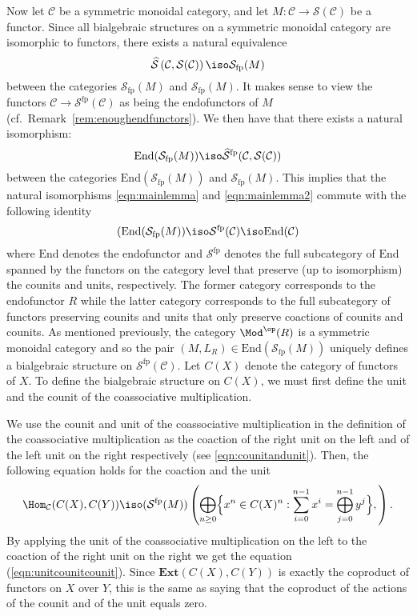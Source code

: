 \documentclass[a4paper,reqno,oneside]{article}
\begin{document}
Now let $\mathcal{C}$ be a symmetric monoidal category, and let $M \colon \mathcal{C} \to \mathcal{S}(\mathcal{C})$ be a functor. Since all bialgebraic structures on a symmetric monoidal category are isomorphic to functors, there exists a natural equivalence 
\[ \widehat{\mathcal{S}}\left(\mathcal{C},\mathcal{S}(\mathcal{C})\right) \iso \mathcal{S}_{\mathrm{fp}}(M)\]
between the categories $\mathcal{S}_{\mathrm{fp}}(M)$ and $\mathcal{S}_{\mathrm{fp}}(M)$. It makes sense to view the functors $\mathcal{C} \to \mathcal{S}^{\mathrm{fp}}(\mathcal{C})$ as being the endofunctors of $M$ (cf.~Remark~\ref{rem:enoughendfunctors}). We then have that there exists a natural isomorphism:
\[ \mathrm{End}(\mathcal{S}_{\mathrm{fp}}(M)) \iso \widehat{\mathcal{S}}^{\mathrm{fp}}(\mathcal{C},\mathcal{S}(\mathcal{C}))\] 
between the categories $\mathrm{End}(\mathcal{S}_{\mathrm{fp}}(M))$ and $\mathcal{S}_{\mathrm{fp}}(M)$. This implies that the natural isomorphisms \eqref{eqn:mainlemma} and \eqref{eqn:mainlemma2} commute with the following identity
\[
(\mathrm{End}(\mathcal{S}_{\mathrm{fp}}(M))\iso\mathcal{S}^{\mathrm{fp}}(\mathcal{C})\iso \mathrm{End}(\mathcal{C})
\]
where $\mathrm{End}$ denotes the endofunctor and $\mathcal{S}^{\mathrm{fp}}$ denotes the full subcategory of $\mathrm{End}$ spanned by the functors on the category level that preserve (up to isomorphism) the counits and units, respectively. The former category corresponds to the endofunctor $R$ while the latter category corresponds to the full subcategory of functors preserving counits and units that only preserve coactions of counits and counits. As mentioned previously, the category $\Mod^{\op}(R)$ is a symmetric monoidal category and so the pair $(M,L_R) \in \mathrm{End}(\mathcal{S}_{\mathrm{fp}}(M))$ uniquely defines a bialgebraic structure on $\mathcal{S}^{\mathrm{fp}}(\mathcal{C})$. Let $C(X)$ denote the category of functors of $X$. To define the bialgebraic structure on $C(X)$, we must first define the unit and the counit of the coassociative multiplication. 

We use the counit and unit of the coassociative multiplication in the definition of the coassociative multiplication as the coaction of the right unit on the left and of the left unit on the right respectively (see \eqref{eqn:counitandunit}). Then, the following equation holds for the coaction and the unit
\[
\Hom_\mathcal{C}(C(X), C(Y)) \iso (\mathcal{S}^{\mathrm{fp}}(M))\left(\bigoplus_{n \geq 0}\Bigl\{x^n \in C(X)^n : \sum_{i=0}^{n-1} x^i = \bigoplus_{j=0}^{n-1} y^j\Bigr\},\right).
\]
By applying the unit of the coassociative multiplication on the left to the coaction of the right unit on the right we get the equation (\eqref{eqn:unitcounitcounit}). Since $\mathbf{Ext}\left(C(X),C(Y)\right)$ is exactly the coproduct of functors on $X$ over $Y$, this is the same as saying that the coproduct of the actions of the counit and of the unit equals zero. 
\end{document}
